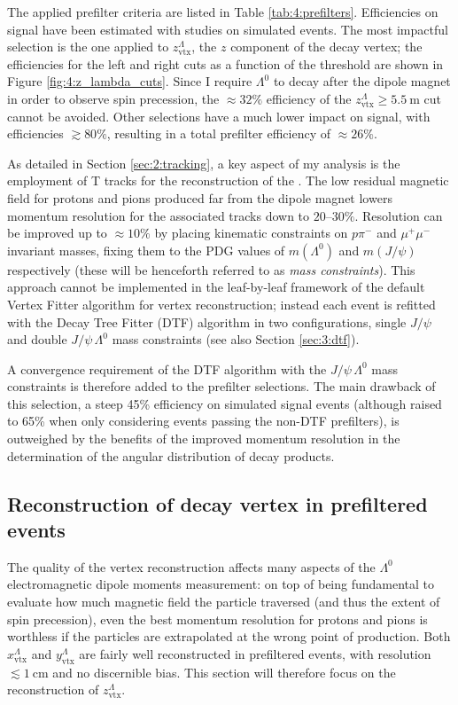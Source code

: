 The applied prefilter criteria are listed in Table \ref{tab:4:prefilters}.
Efficiencies on signal have been estimated with studies on simulated \demonstratorshort events.
The most impactful selection is the one applied to $z_\text{vtx}^\Lambda$, the $z$ component of the \lambdadecay decay vertex;
the efficiencies for the left and right cuts as a function of the threshold are shown in Figure \ref{fig:4:z_lambda_cuts}.
Since I require $\Lambda^0$ to decay after the dipole magnet in order to observe spin precession, the $\approx 32\%$ efficiency of the $z_\text{vtx}^\Lambda \geq \SI{5.5}{\meter}$ cut cannot be avoided.
Other selections have a much lower impact on signal, with efficiencies $\gtrsim 80\%$, resulting in a total prefilter efficiency of $\approx 26\%$.

As detailed in Section \ref{sec:2:tracking}, a key aspect of my analysis is the employment of T tracks for the reconstruction of the \lz.
The low residual magnetic field for protons and pions produced far from the dipole magnet lowers momentum resolution for the associated tracks down to $20$--$30\%$.
Resolution can be improved up to $\approx 10\%$ by placing kinematic constraints on $p\pi^-$ and $\mu^+ \mu^-$ invariant masses, fixing them to the PDG values of $m(\Lambda^0)$ and $m(J/\psi)$ respectively (these will be henceforth referred to as \textit{mass constraints}).
This approach cannot be implemented in the leaf-by-leaf framework of the default Vertex Fitter algorithm for vertex reconstruction;
instead each event is refitted with the Decay Tree Fitter (DTF) algorithm in two configurations, single $J/\psi$ and double $J/\psi\,\Lambda^0$ mass constraints (see also Section \ref{sec:3:dtf}).

A convergence requirement of the DTF algorithm with the $J/\psi\,\Lambda^0$ mass constraints is therefore added to the prefilter selections.
The main drawback of this selection, a steep 45\% efficiency on simulated signal events (although raised to 65\% when only considering events passing the non-DTF prefilters), is outweighed by the benefits of the improved momentum resolution in the determination of the angular distribution of \lambdadecay decay products.


\subsection{Reconstruction of \texorpdfstring{\lz}{Lambda} decay vertex in prefiltered events}
\label{sec:lambda_endvertex_bias}

The quality of the \lambdadecay vertex reconstruction affects many aspects of the $\Lambda^0$ electromagnetic dipole moments measurement:
on top of being fundamental to evaluate how much magnetic field the particle traversed (and thus the extent of spin precession), even the best momentum resolution for protons and pions is worthless if the particles are extrapolated at the wrong point of production.
Both $x_\text{vtx}^\Lambda$ and $y_\text{vtx}^\Lambda$ are fairly well reconstructed in prefiltered events, with resolution $\lesssim \SI{1}{\centi\meter}$ and no discernible bias.
This section will therefore focus on the reconstruction of $z_\text{vtx}^\Lambda$.

